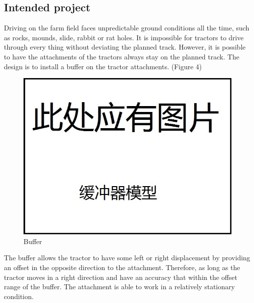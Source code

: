 \documentclass[12pt]{article}
\begin{document}
\begin{flushleft}
\subsection{Intended project}

Driving on the farm field faces unpredictable ground conditions all the time, such as rocks, mounds, slide, rabbit or rat holes. It is impossible for tractors to drive through every thing without deviating the planned track. However, it is possible to have the attachments of the tractors always stay on the planned track. The design is to install a buffer on the tractor attachments. (Figure 4)
\begin{figure}[ht!]
	\begin{center}
		\includegraphics[scale = 0.6]{buffer.jpg}
		\caption{Buffer}
	\end{center}
\end{figure} 
The buffer allows the tractor to have some left or right displacement by providing an offset in the opposite direction to the attachment. Therefore, as long as the tractor moves in a right direction and have an accuracy that within the offset range of the buffer. The attachment is able to work in a relatively stationary condition. 


\end{flushleft}
\end{document}
